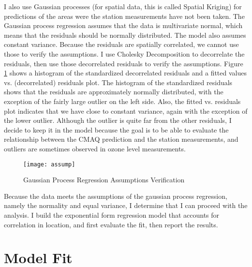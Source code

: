 \documentclass{svproc}
\begin{document}
I also use Gaussian processes (for spatial data, this is called Spatial Kriging) for predictions of the areas were the station measurements have not been taken. The Gaussian process regression assumes that the data is multivariate normal, which means that the residuals should be normally distributed. The model also assumes constant variance. Because the residuals are spatially correlated, we cannot use those to verify the assumptions. I use Cholesky Decomposition to decorrelate the residuals, then use those decorrelated residuals to verify the assumptions. Figure \ref{assump} shows a histogram of the standardized decorrelated residuals and a fitted values vs. (decorrelated) residuals plot. The histogram of the standardized residuals shows that the residuals are approximately normally distributed, with the exception of the fairly large outlier on the left side. Also, the fitted vs. residuals plot indicates that we have close to constant variance, again with the exception of the lower outlier. Although the outlier is quite far from the other residuals, I decide to keep it in the model because the goal is to be able to evaluate the relationship between the CMAQ prediction and the station measurements, and outliers are sometimes observed in ozone level measurements.

\begin{figure}
\begin{center}
\caption{Gaussian Process Regression Assumptions Verification}
\texttt{[image: assump]}
\label{assump}
\smallskip
\end{center}
\end{figure}

Because the data meets the assumptions of the gaussian process regression, namely the normality and equal variance, I determine that I can proceed with the analysis. I build the exponential form regression model that accounts for correlation in location, and first evaluate the fit, then report the results.

\section{Model Fit}
\end{document}
